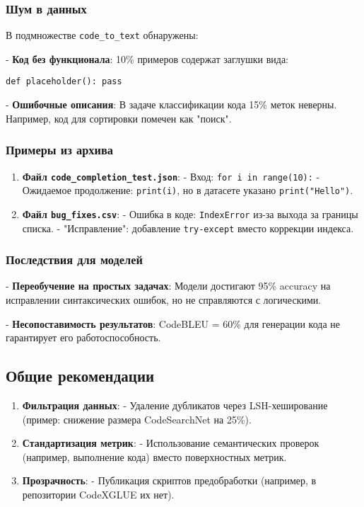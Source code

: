 \documentclass[14pt]{article}
\theoremstyle{definition}
\begin{document}
\subsubsection{Шум в данных}

В подмножестве \texttt{code\_to\_text} обнаружены:

    
- \textbf{Код без функционала}: 10\% примеров содержат заглушки вида:
    \begin{verbatim}
def placeholder(): pass
    \end{verbatim}
    
- \textbf{Ошибочные описания}: В задаче классификации кода 15\% меток неверны. Например, код для сортировки помечен как "поиск".


\subsubsection{Примеры из архива}

\begin{enumerate}
    \item \textbf{Файл \texttt{code\_completion\_test.json}}:  
      - Вход: \texttt{for i in range(10):}  
      - Ожидаемое продолжение: \texttt{print(i)}, но в датасете указано \texttt{print("Hello")}.
    \item \textbf{Файл \texttt{bug\_fixes.csv}}:  
      - Ошибка в коде: \texttt{IndexError} из-за выхода за границы списка.  
      - "Исправление": добавление \texttt{try-except} вместо коррекции индекса.
\end{enumerate}

\subsubsection{Последствия для моделей}


    
- \textbf{Переобучение на простых задачах}: Модели достигают 95\% accuracy на исправлении синтаксических ошибок, но не справляются с логическими.
    
- \textbf{Несопоставимость результатов}: CodeBLEU = 60\% для генерации кода не гарантирует его работоспособность.


\subsection{Общие рекомендации}

\begin{enumerate}
    \item \textbf{Фильтрация данных}:  
      - Удаление дубликатов через LSH-хеширование (пример: снижение размера CodeSearchNet на 25\%).
    \item \textbf{Стандартизация метрик}:  
      - Использование семантических проверок (например, выполнение кода) вместо поверхностных метрик.
    \item \textbf{Прозрачность}:  
      - Публикация скриптов предобработки (например, в репозитории CodeXGLUE \cite{codexglue_repo} их нет).
\end{enumerate}
\end{document}
